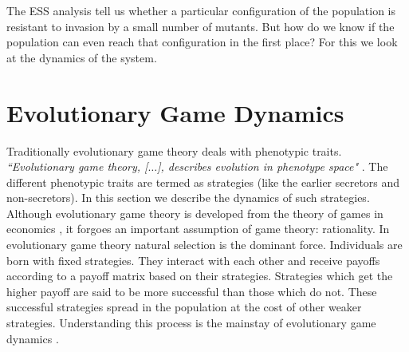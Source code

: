\documentclass[oneside,11pt,a4paper]{book}
\begin{document}
The ESS analysis tell us whether a particular configuration of the population is resistant to invasion by a small number of mutants.
But how do we know if the population can even reach that configuration in the first place?
For this we look at the dynamics of the system.

\newpage
\section{Evolutionary Game Dynamics}
\label{sec:EGD}
Traditionally evolutionary game theory deals with phenotypic traits.
\textit{``Evolutionary game theory, [$\ldots$], describes evolution in phenotype space"} \citep{nowak:2004aa}.
The different phenotypic traits are termed as strategies (like the earlier secretors and non-secretors).
In this section we describe the dynamics of such strategies.
Although evolutionary game theory is developed from the theory of games in economics \citep{neumann:1944ef}, it forgoes an important assumption of game theory: rationality.
In evolutionary game theory natural selection is the dominant force.
Individuals are born with fixed strategies.
They interact with each other and receive payoffs according to a payoff matrix based on their strategies.
Strategies which get the higher payoff are said to be more successful than those which do not.
These successful strategies spread in the population at the cost of other weaker strategies.
Understanding this process is the mainstay of evolutionary game dynamics \citep{sandholm:2010bo}.
\\
\end{document}
